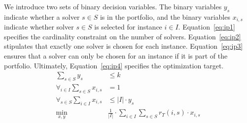 \documentclass[conference]{IEEEtran}
\begin{document}
We introduce two sets of binary decision variables. 
The binary variables $y_s$ indicate whether a solver $s \in S$ is in the portfolio, and 
the binary variables $x_{i,s}$ indicate whether solver $s \in S$ is selected for instance $i \in I$. 
Equation~\ref{eq:ip1} specifies the cardinality constraint on the number of solvers. 
Equation~\ref{eq:ip2} stipulates that exactly one solver is chosen for each instance. 
Equation~\ref{eq:ip3} ensures that a solver can only be chosen for an instance if it is part of the portfolio. 
Ultimately, Equation~\ref{eq:ip4} specifies the optimization target.%
\begin{align}
	\sum_{s \in S} y_s &\leq k \label{eq:ip1}\\
	\forall_{i\in I} \sum_{s \in S} x_{i,s} &= 1 \label{eq:ip2}\\
	\forall_{s \in S} \sum_{i \in I} x_{i,s} &\leq |I| \cdot y_s \label{eq:ip3}\\
	\min_{x,y} \quad & \frac{1}{|I|} \cdot \sum_{i \in I} \sum_{s \in S} r_T(i,s) \cdot x_{i,s} \label{eq:ip4}
\end{align}
\end{document}
